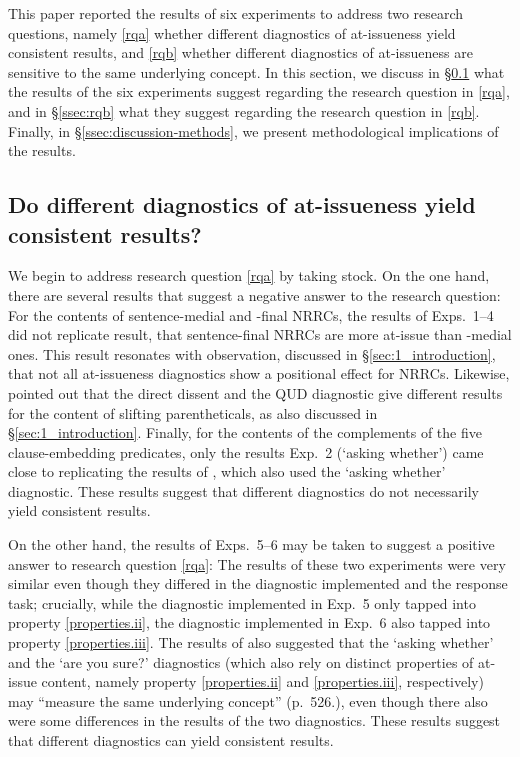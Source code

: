 \documentclass[times,linguex]{glossa}
\begin{document}
This paper reported the results of six experiments to address two research questions, namely \ref{rqa} whether different diagnostics of at-issueness yield consistent results, and \ref{rqb} whether different diagnostics of at-issueness are sensitive to the same underlying concept. In this section, we discuss in \S\ref{ssec:rqa} what the results of the six experiments suggest regarding the research question in \ref{rqa}, and in \S\ref{ssec:rqb} what they suggest regarding the research question in \ref{rqb}. Finally, in \S\ref{ssec:discussion-methods}, we present methodological implications of the results. 

\subsection{Do different diagnostics of at-issueness yield consistent results?}\label{ssec:rqa}

We begin to address research question \ref{rqa} by taking stock. On the one hand, there are several results that suggest a negative answer to the research question: For the contents of sentence-medial and -final NRRCs, the results of Exps.~1--4 did not replicate  result, that sentence-final NRRCs are more at-issue than -medial ones. This result resonates with  observation, discussed in \S\ref{sec:1_introduction}, that not all at-issueness diagnostics show a positional effect for NRRCs. Likewise, \citealt{koev_notions_2018} pointed out that the direct dissent and the QUD diagnostic give different results for the content of slifting parentheticals, as also discussed in \S\ref{sec:1_introduction}. Finally, for the contents of the complements of the five clause-embedding predicates, only the results Exp.~2 (`asking whether') came close to replicating the results of \citealt{degen_projection_2025}, which also used the `asking whether' diagnostic. These results suggest that different diagnostics do not necessarily yield consistent results.

On the other hand, the results of Exps.~5--6 may be taken to suggest a positive answer to research question \ref{rqa}: The results of these two experiments were very similar even though they differed in the diagnostic implemented and the response task; crucially, while the diagnostic implemented in Exp.~5 only tapped into property \ref{properties.ii}, the diagnostic implemented in Exp.~6 also tapped into property \ref{properties.iii}. The results of \citealt{tonhauser_how_2018} also suggested that the `asking whether' and the `are you sure?' diagnostics (which also rely on distinct properties of at-issue content, namely property \ref{properties.ii} and \ref{properties.iii}, respectively) may ``measure the same underlying concept'' (p.~526.), even though there also were some differences in the results of the two diagnostics. These results suggest that different diagnostics can yield consistent results. 
\end{document}
